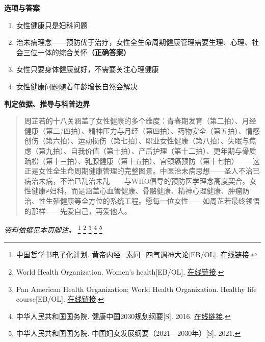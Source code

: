 \textbf{选项与答案}
\begin{enumerate}[label=\Alph*.,leftmargin=*]
  \item 女性健康只是妇科问题
  \item 治未病理念——预防优于治疗，女性全生命周期健康管理需要生理、心理、社会三位一体的综合关怀\textbf{（正确答案）}
  \item 女性只要身体健康就好，不需要关注心理健康
  \item 女性健康问题随着年龄增长自然会解决
\end{enumerate}
\textbf{判定依据、推导与科普边界}
\begin{quote}周芷若的十八关涵盖了女性健康的多个维度：青春期发育（第二拍）、月经健康（第二/四拍）、精神压力与月经（第四拍）、药物安全（第五拍）、情感创伤（第六拍）、运动损伤（第七拍）、职业女性健康（第八拍）、失眠与焦虑（第九拍）、自我价值（第十拍）、产后护理（第十二拍）、更年期与骨质疏松（第十三拍）、乳腺健康（第十五拍）、宫颈癌预防（第十七拍）——这正是女性全生命周期健康管理的完整图景。中医治未病思想——圣人不治已病治未病，不治已乱治未乱——与WHO倡导的预防医学理念高度契合。女性健康≠妇科，而是涵盖心血管健康、骨骼健康、精神心理健康、肿瘤防治、性生殖健康等全方位的系统工程。愿每一位女性——如周芷若最终领悟的那样——先爱自己，再爱他人。\end{quote}
\noindent\textit{资料依据见本页脚注。}
\footnote{中国哲学书电子化计划. 黄帝内经·素问·四气调神大论[EB/OL]. \href{https://ctext.org/huangdi-neijing/si-qi-diao-shen-da-lun/zhs}{在线链接}.}
\footnote{World Health Organization. Women’s health[EB/OL]. \href{https://www.who.int/health-topics/women-s-health}{在线链接}.}
\footnote{Pan American Health Organization; World Health Organization. Healthy life course[EB/OL]. \href{https://www.paho.org/en/topics/healthy-life-course}{在线链接}.}
\footnote{中华人民共和国国务院. 健康中国2030规划纲要[S]. 2016. \href{https://www.gov.cn/zhengce/2016-10/25/content_5124174.htm}{在线链接}.}
\footnote{中华人民共和国国务院. 中国妇女发展纲要（2021—2030年）[S]. 2021.}
